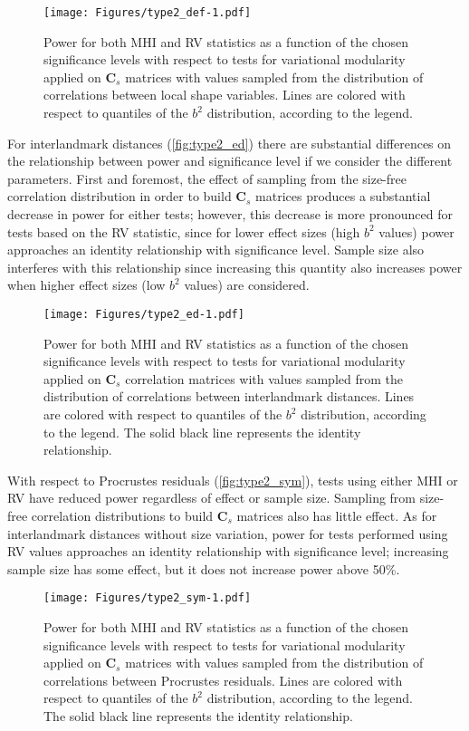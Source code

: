 \documentclass[12pt,twoside]{report}
\begin{document}
\begin{figure}[htbp]
\centering
\texttt{[image: Figures/type2\_def-1.pdf]}
\caption{Power for both MHI and RV statistics as a function of the
chosen significance levels with respect to tests for variational
modularity applied on $\mathbf{C}_s$ matrices with values sampled from
the distribution of correlations between local shape variables. Lines
are colored with respect to quantiles of the $b^2$ distribution,
according to the legend. \label{fig:type2_def}}
\end{figure}

For interlandmark distances (\autoref{fig:type2_ed}) there are
substantial differences on the relationship between power and
significance level if we consider the different parameters. First and
foremost, the effect of sampling from the size-free correlation
distribution in order to build $\mathbf{C}_s$ matrices produces a
substantial decrease in power for either tests; however, this decrease
is more pronounced for tests based on the RV statistic, since for lower
effect sizes (high $b^2$ values) power approaches an identity
relationship with significance level. Sample size also interferes with
this relationship since increasing this quantity also increases power
when higher effect sizes (low $b^2$ values) are considered.

\begin{figure}[htbp]
\centering
\texttt{[image: Figures/type2\_ed-1.pdf]}
\caption{Power for both MHI and RV statistics as a function of the
chosen significance levels with respect to tests for variational
modularity applied on $\mathbf{C}_s$ correlation matrices with values
sampled from the distribution of correlations between interlandmark
distances. Lines are colored with respect to quantiles of the $b^2$
distribution, according to the legend. The solid black line represents
the identity relationship. \label{fig:type2_ed}}
\end{figure}

With respect to Procrustes residuals (\autoref{fig:type2_sym}), tests
using either MHI or RV have reduced power regardless of effect or sample
size. Sampling from size-free correlation distributions to build
$\mathbf{C}_s$ matrices also has little effect. As for interlandmark
distances without size variation, power for tests performed using RV
values approaches an identity relationship with significance level;
increasing sample size has some effect, but it does not increase power
above 50\%.

\begin{figure}[htbp]
\centering
\texttt{[image: Figures/type2\_sym-1.pdf]}
\caption{Power for both MHI and RV statistics as a function of the
chosen significance levels with respect to tests for variational
modularity applied on $\mathbf{C}_s$ matrices with values sampled from
the distribution of correlations between Procrustes residuals. Lines are
colored with respect to quantiles of the $b^2$ distribution, according
to the legend. The solid black line represents the identity
relationship. \label{fig:type2_sym}}
\end{figure}
\end{document}
